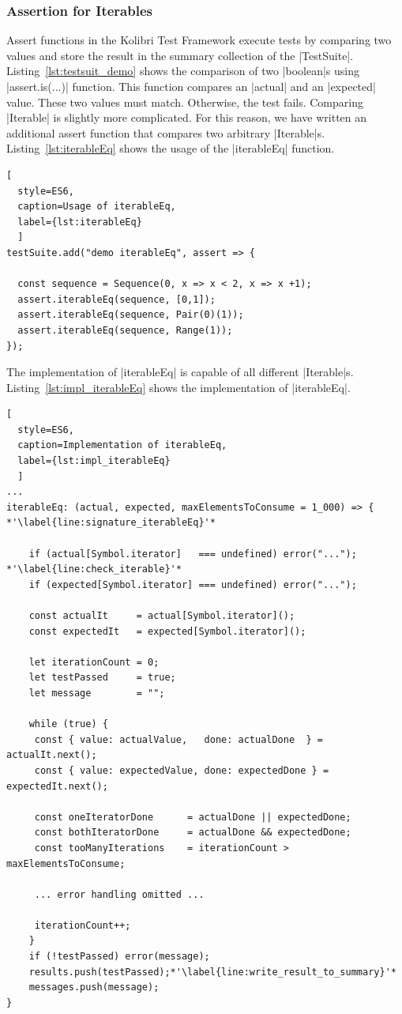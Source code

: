 \subsubsection{Assertion for Iterables}
\label{subsub:Assertion for Iterables}
Assert functions in the Kolibri Test Framework execute tests by comparing
two values and store the result in the summary collection of the |TestSuite|.
Listing~\ref{lst:testsuit_demo} shows the comparison of two |boolean|s using
|assert.is(...)| function.
This function compares an |actual| and an |expected| value. These two values
must match. Otherwise, the test fails.
\newline
Comparing |Iterable| is slightly more complicated. For this reason, we have 
written an additional assert function that compares two arbitrary |Iterable|s.
Listing~\ref{lst:iterableEq} shows the usage of the |iterableEq| function.

\begin{lstlisting}[
  style=ES6, 
  caption=Usage of iterableEq,
  label={lst:iterableEq}
  ]
testSuite.add("demo iterableEq", assert => {

  const sequence = Sequence(0, x => x < 2, x => x +1);
  assert.iterableEq(sequence, [0,1]);
  assert.iterableEq(sequence, Pair(0)(1));
  assert.iterableEq(sequence, Range(1));
});  
\end{lstlisting}

The implementation of |iterableEq| is capable of all different 
|Iterable|s. Listing~\ref{lst:impl_iterableEq} shows the
implementation of |iterableEq|. 

\begin{lstlisting}[
  style=ES6, 
  caption=Implementation of iterableEq,
  label={lst:impl_iterableEq}
  ]
...
iterableEq: (actual, expected, maxElementsToConsume = 1_000) => { *'\label{line:signature_iterableEq}'*

    if (actual[Symbol.iterator]   === undefined) error("..."); *'\label{line:check_iterable}'*
    if (expected[Symbol.iterator] === undefined) error("...");

    const actualIt     = actual[Symbol.iterator]();
    const expectedIt   = expected[Symbol.iterator]();

    let iterationCount = 0;
    let testPassed     = true;
    let message        = "";

    while (true) {
     const { value: actualValue,   done: actualDone  } = actualIt.next();
     const { value: expectedValue, done: expectedDone } = expectedIt.next();

     const oneIteratorDone      = actualDone || expectedDone;
     const bothIteratorDone     = actualDone && expectedDone;
     const tooManyIterations    = iterationCount > maxElementsToConsume;

     ... error handling omitted ...

     iterationCount++;
    }
    if (!testPassed) error(message);
    results.push(testPassed);*'\label{line:write_result_to_summary}'*
    messages.push(message);
}
\end{lstlisting}

